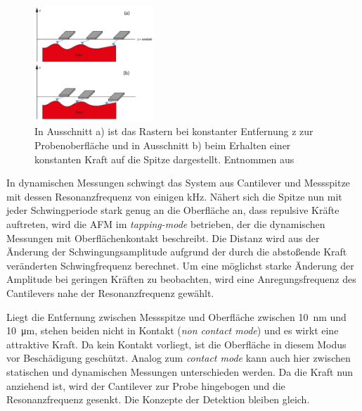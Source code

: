           \FloatBarrier

          \begin{figure}[h]
            \centering
            \includegraphics[width = 0.4\textwidth]{pictures/const_height_force.png}
            \caption{In Ausschnitt a) ist das Rastern bei konstanter Entfernung z zur Probenoberfläche und in Ausschnitt b) beim Erhalten einer konstanten Kraft auf die Spitze dargestellt. Entnommen aus \cite{voigtlander_scanning_2015}}
            \label{fig:modi}
          \end{figure}
        
          \FloatBarrier  
          \newpage
                 
          In dynamischen Messungen schwingt das System aus Cantilever und Messspitze mit dessen 
          Resonanzfrequenz von einigen kHz. Nähert sich die Spitze nun mit jeder Schwingperiode stark genug an die Oberfläche an, dass repulsive Kräfte auftreten, wird die AFM im \textit{tapping-mode}
          betrieben, der die dynamischen Messungen mit Oberflächenkontakt beschreibt. Die Distanz wird aus der Änderung der Schwingungsamplitude aufgrund der durch die abstoßende Kraft veränderten 
          Schwingfrequenz berechnet. Um eine möglichst starke Änderung der Amplitude bei geringen Kräften zu beobachten, wird eine Anregungsfrequenz des Cantilevers nahe der Resonanzfrequenz gewählt.
          
          Liegt die Entfernung zwischen Messspitze und Oberfläche zwischen \SI{10}{\nano\metre} und \SI{10}{\micro\metre}, stehen beiden nicht in Kontakt (\textit{non contact mode}) und es wirkt eine 
          attraktive Kraft. Da kein Kontakt vorliegt, ist die Oberfläche in diesem Modus vor Beschädigung geschützt. Analog zum \textit{contact mode} kann auch hier zwischen statischen und dynamischen 
          Messungen unterschieden werden. Da die Kraft nun anziehend ist, wird der Cantilever zur Probe hingebogen und die Resonanzfrequenz gesenkt. Die Konzepte der Detektion bleiben gleich.
          



